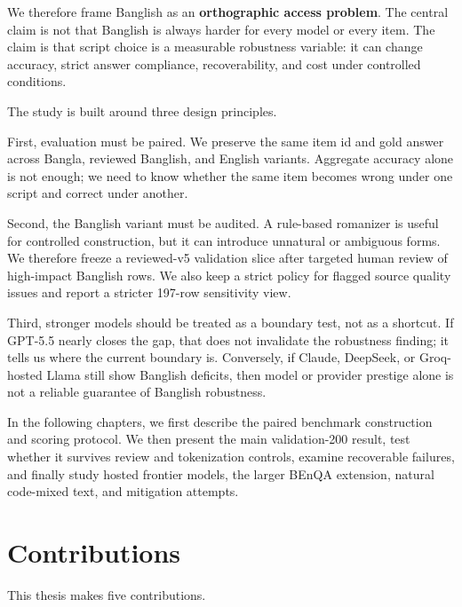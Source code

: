 We therefore frame Banglish as an \textbf{orthographic access problem}. The central claim is not that Banglish is always harder for every model or every item. The claim is that script choice is a measurable robustness variable: it can change accuracy, strict answer compliance, recoverability, and cost under controlled conditions.

The study is built around three design principles.

First, evaluation must be paired. We preserve the same item id and gold answer across Bangla, reviewed Banglish, and English variants. Aggregate accuracy alone is not enough; we need to know whether the same item becomes wrong under one script and correct under another.

Second, the Banglish variant must be audited. A rule-based romanizer is useful for controlled construction, but it can introduce unnatural or ambiguous forms. We therefore freeze a reviewed-v5 validation slice after targeted human review of high-impact Banglish rows. We also keep a strict policy for flagged source quality issues and report a stricter 197-row sensitivity view.

Third, stronger models should be treated as a boundary test, not as a shortcut. If GPT-5.5 nearly closes the gap, that does not invalidate the robustness finding; it tells us where the current boundary is. Conversely, if Claude, DeepSeek, or Groq-hosted Llama still show Banglish deficits, then model or provider prestige alone is not a reliable guarantee of Banglish robustness.

In the following chapters, we first describe the paired benchmark construction and scoring protocol. We then present the main validation-200 result, test whether it survives review and tokenization controls, examine recoverable failures, and finally study hosted frontier models, the larger BEnQA extension, natural code-mixed text, and mitigation attempts.

\section{Contributions}

This thesis makes five contributions.

